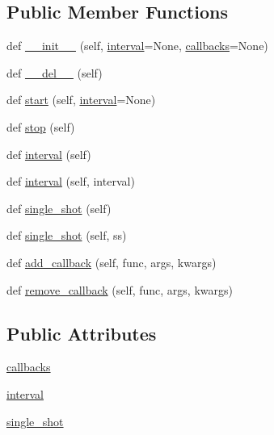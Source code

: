 \subsection*{Public Member Functions}
\begin{DoxyCompactItemize}
\item 
def \hyperlink{classmatplotlib_1_1backend__bases_1_1TimerBase_accab61924e1bbf99cc279c4623f765f0}{\+\_\+\+\_\+init\+\_\+\+\_\+} (self, \hyperlink{classmatplotlib_1_1backend__bases_1_1TimerBase_a3070e43370c069bffa933a51f5c1b9d7}{interval}=None, \hyperlink{classmatplotlib_1_1backend__bases_1_1TimerBase_aec6debcd3cd82e1faef08eae87f2ae3f}{callbacks}=None)
\item 
def \hyperlink{classmatplotlib_1_1backend__bases_1_1TimerBase_a152a5a66ba075701ed935b2b2428f9e0}{\+\_\+\+\_\+del\+\_\+\+\_\+} (self)
\item 
def \hyperlink{classmatplotlib_1_1backend__bases_1_1TimerBase_a1b96fbbb1dfafc76731ccdd84079f0b1}{start} (self, \hyperlink{classmatplotlib_1_1backend__bases_1_1TimerBase_a3070e43370c069bffa933a51f5c1b9d7}{interval}=None)
\item 
def \hyperlink{classmatplotlib_1_1backend__bases_1_1TimerBase_aa303005348c43f5a084830ee283cabde}{stop} (self)
\item 
def \hyperlink{classmatplotlib_1_1backend__bases_1_1TimerBase_a1dee6c43410451f2b0d9e409eda754af}{interval} (self)
\item 
def \hyperlink{classmatplotlib_1_1backend__bases_1_1TimerBase_a59501ba97b0422e2e0606c7703f85bf9}{interval} (self, interval)
\item 
def \hyperlink{classmatplotlib_1_1backend__bases_1_1TimerBase_a1dc74a3c8b17800cbced995985c0635b}{single\+\_\+shot} (self)
\item 
def \hyperlink{classmatplotlib_1_1backend__bases_1_1TimerBase_a17d83b97785c95a40ff98af4230c46b5}{single\+\_\+shot} (self, ss)
\item 
def \hyperlink{classmatplotlib_1_1backend__bases_1_1TimerBase_a8ad446b09f04c87ee93d440e1079885d}{add\+\_\+callback} (self, func, args, kwargs)
\item 
def \hyperlink{classmatplotlib_1_1backend__bases_1_1TimerBase_ab3ec2638a4c890bd7230005891ddefdd}{remove\+\_\+callback} (self, func, args, kwargs)
\end{DoxyCompactItemize}
\subsection*{Public Attributes}
\begin{DoxyCompactItemize}
\item 
\hyperlink{classmatplotlib_1_1backend__bases_1_1TimerBase_aec6debcd3cd82e1faef08eae87f2ae3f}{callbacks}
\item 
\hyperlink{classmatplotlib_1_1backend__bases_1_1TimerBase_a3070e43370c069bffa933a51f5c1b9d7}{interval}
\item 
\hyperlink{classmatplotlib_1_1backend__bases_1_1TimerBase_ae796176ccaeb226e0e25b20e03feb1f3}{single\+\_\+shot}
\end{DoxyCompactItemize}


